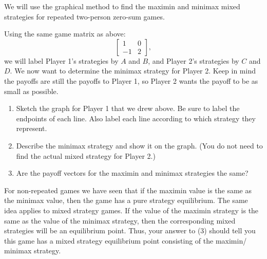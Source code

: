 




\vspace{.1in}
We will use the graphical method to find the maximin and minimax mixed strategies for repeated  two-person zero-sum games. 

Using the same game matrix as above: \[\left[\begin{matrix}
1&0\\
-1&2

\end{matrix}\right],
\]
we will label Player 1's strategies by $A$ and $B$, and Player 2's strategies by $C$ and $D$. We now want to determine the minimax strategy for Player 2. Keep in mind the payoffs are still the payoffs to Player 1, so Player 2 wants the payoff to be as small as possible.

\begin{enumerate}
\item Sketch the graph for Player 1 that we drew above. Be sure to label the endpoints  of each line. Also label each line according to which strategy they represent. 
\vspace{.1in}

\item Describe the minimax strategy and show it on the graph. (You do not need to find the actual mixed strategy for Player 2.) 
\vspace{.1 in}

\item Are the payoff vectors for the maximin and minimax strategies the same?\vspace{.1 in}
\end{enumerate}

For non-repeated games we have seen that if the maximin value is the same as the minimax value, then the game has a pure strategy equilibrium. The same idea applies to mixed strategy games. If the value of the maximin  strategy is the same as the value of the minimax strategy, then the corresponding mixed strategies will be an equilibrium point. Thus, your answer to (3) should tell you this game has a mixed strategy equilibrium point consisting of the maximin/ minimax strategy.

